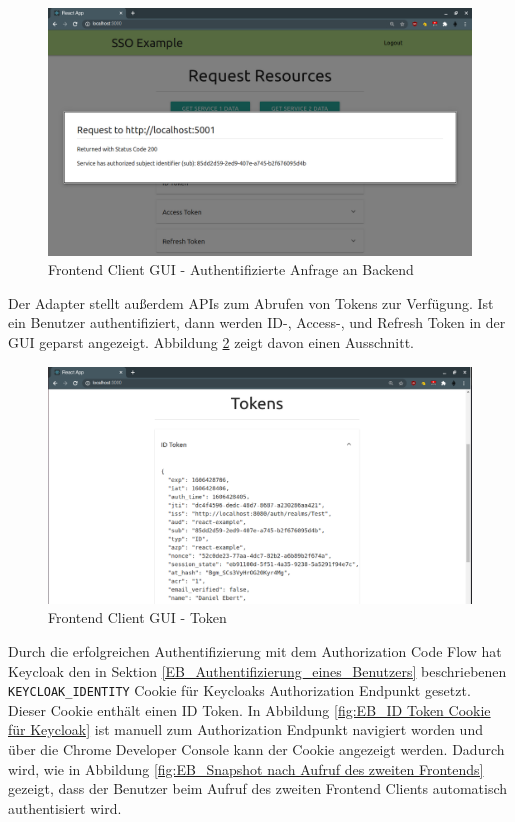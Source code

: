 \begin{figure}[!ht]
	\centering
	\includegraphics[width=1\textwidth]{Images/Ebert/FrontendLoggedInBackendRequest.PNG}
	\caption{Frontend Client GUI - Authentifizierte Anfrage an Backend}
	\label{fig:EB_Authentifizierte Anfrage an Backend}
\end{figure} 

Der Adapter stellt außerdem APIs zum Abrufen von Tokens zur Verfügung. Ist ein Benutzer authentifiziert, dann werden ID-, Access-, und Refresh Token in der GUI geparst angezeigt. Abbildung \ref{fig:EB_Token} zeigt davon einen Ausschnitt.

\begin{figure}[!ht]
	\centering
	\includegraphics[width=1\textwidth]{Images/Ebert/FrontendIDTokenExample.PNG}
	\caption{Frontend Client GUI - Token}
	\label{fig:EB_Token}
\end{figure}

Durch die erfolgreichen Authentifizierung mit dem Authorization Code Flow hat Keycloak den in Sektion \ref{EB_Authentifizierung_eines_Benutzers} beschriebenen \texttt{KEYCLOAK\_IDENTITY} Cookie für Keycloaks Authorization Endpunkt gesetzt. Dieser Cookie enthält einen ID Token. In Abbildung \ref{fig:EB_ID Token Cookie für Keycloak} ist manuell zum Authorization Endpunkt navigiert worden und über die Chrome Developer Console kann der Cookie angezeigt werden. Dadurch wird, wie in Abbildung \ref{fig:EB_Snapshot nach Aufruf des zweiten Frontends} gezeigt, dass der Benutzer beim Aufruf des zweiten Frontend Clients automatisch authentisiert wird.

